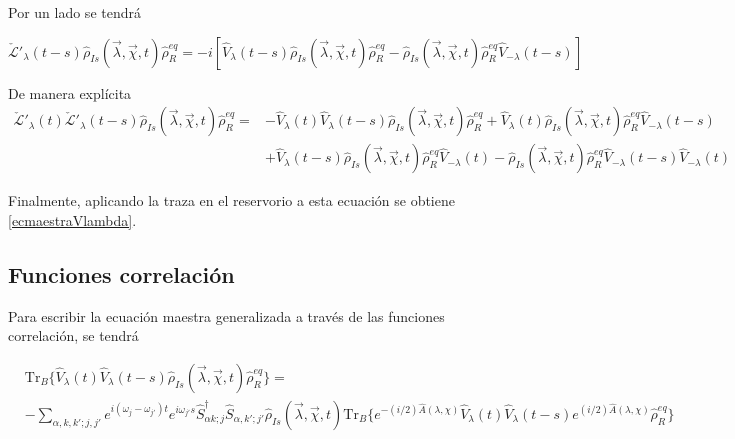 \begin{appendixs}
Por un lado se tendrá

\begin{equation*}
    \check{\mathcal{L}}'_{\lambda}(t-s)\hat{\rho}_{Is}(\vec{\lambda},\vec{\chi},t)\hat{\rho}_{R}^{eq} = -i[\hat{V}_{\lambda}(t-s)\hat{\rho}_{Is}(\vec{\lambda},\vec{\chi},t)\hat{\rho}^{eq}_{R} -  \hat{\rho}_{Is}(\vec{\lambda},\vec{\chi},t)\hat{\rho}^{eq}_{R}\hat{V}_{-\lambda}(t-s)]
\end{equation*}

De manera explícita
\begin{align*}
    \check{\mathcal{L}}'_{\lambda}(t)\check{\mathcal{L}}'_{\lambda}(t-s)\hat{\rho}_{Is}(\vec{\lambda},\vec{\chi},t)\hat{\rho}_{R}^{eq}  = &  -\hat{V}_{\lambda}(t)\hat{V}_{\lambda}(t-s)\hat{\rho}_{Is}(\vec{\lambda},\vec{\chi},t)\hat{\rho}_{R}^{eq} + \hat{V}_{\lambda}(t)\hat{\rho}_{Is}(\vec{\lambda},\vec{\chi},t)\hat{\rho}_{R}^{eq}\hat{V}_{-\lambda}(t-s) \\
    & + \hat{V}_{\lambda}(t-s)\hat{\rho}_{Is}(\vec{\lambda},\vec{\chi},t)\hat{\rho}_{R}^{eq}\hat{V}_{-\lambda}(t) - \hat{\rho}_{Is}(\vec{\lambda},\vec{\chi},t)\hat{\rho}_{R}^{eq}\hat{V}_{-\lambda}(t-s)\hat{V}_{-\lambda}(t)
\end{align*}

Finalmente, aplicando la traza en el reservorio a esta ecuación se obtiene \ref{ecmaestraVlambda}.

    \label{apendixsubsectionmatriz}
    
\newpage

\subsection{Funciones correlación}
Para escribir la ecuación maestra generalizada a través de las funciones correlación, se tendrá

\begin{align*}
& \text{Tr}_{B}\{ \hat{V}_{\lambda}(t)\hat{V}_{\lambda}(t-s) \hat{\rho}_{Is}(\vec{\lambda},\vec{\chi},t)\hat{\rho}^{eq}_{R} \}  =\\
&  - \sum_{\alpha,k,k';j,j'}e^{i(\omega_{j}-\omega_{j'})t}e^{i\omega_{j'}s}\hat{S}^{\dagger}_{\alpha k;j}\hat{S}_{\alpha,k';j'}\hat{\rho}_{Is}(\vec{\lambda},\vec{\chi},t)\text{Tr}_{B}\{e^{-(i/2)\hat{A}(\lambda,\chi)}\hat{V}_{\lambda}(t)\hat{V}_{\lambda}(t-s)e^{(i/2)\hat{A}(\lambda,\chi)}\hat{\rho}^{eq}_{R}\} 
\end{align*}    


\end{appendixs}
